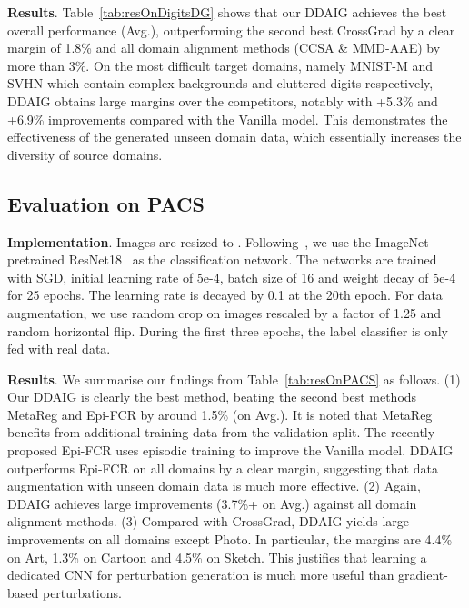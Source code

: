\documentclass[letterpaper]{article}
\newcommand{\keypoint}[1]{\vspace{0.1cm}\noindent\textbf{#1}}
\begin{document}
\keypoint{Results}.
Table~\ref{tab:resOnDigitsDG} shows that our DDAIG achieves the best overall performance (Avg.), outperforming the second best CrossGrad by a clear margin of 1.8\% and all domain alignment methods (CCSA \& MMD-AAE) by more than 3\%. On the most difficult target domains, namely MNIST-M and SVHN which contain complex backgrounds and cluttered digits respectively, DDAIG obtains large margins over the competitors, notably with +5.3\% and +6.9\% improvements compared with the Vanilla model. This demonstrates the effectiveness of the generated unseen domain data, which essentially increases the diversity of source domains.




\subsection{Evaluation on PACS}
\keypoint{Implementation}.
Images are resized to . Following~\cite{cvpr19JiGen,li2019episodic}, we use the ImageNet-pretrained ResNet18~\cite{he2016deep} as the classification network.
The networks are trained with SGD, initial learning rate of 5e-4, batch size of 16 and weight decay of 5e-4 for 25 epochs. The learning rate is decayed by 0.1 at the 20th epoch.
For data augmentation, we use random crop on images rescaled by a factor of 1.25 and random horizontal flip.
During the first three epochs, the label classifier is only fed with real data.


\keypoint{Results}.
We summarise our findings from Table~\ref{tab:resOnPACS} as follows.
(1) Our DDAIG is clearly the best  method, beating the second best methods MetaReg and Epi-FCR by around 1.5\% (on Avg.). It is noted that MetaReg benefits from additional training data from the validation split. The recently proposed Epi-FCR uses episodic training to improve the Vanilla model. DDAIG outperforms Epi-FCR on all domains by a clear margin, suggesting that data augmentation with unseen domain data is much more effective.
(2) Again, DDAIG achieves large improvements (3.7\%+ on Avg.) against all domain alignment methods.
(3) Compared with CrossGrad, DDAIG yields large improvements on all domains except Photo. In particular, the margins are 4.4\% on Art, 1.3\% on Cartoon and 4.5\% on Sketch. This justifies that learning a dedicated CNN for perturbation generation is much more useful than gradient-based perturbations.
\end{document}
